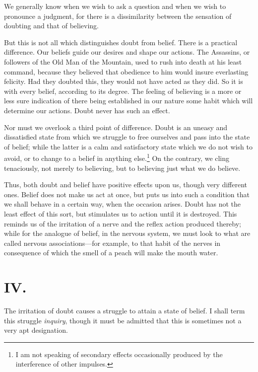We generally know when we wish to ask a question and when we wish to
pronounce a judgment, for there is a dissimilarity between the
sensation of doubting and that of believing.

But this is not all which distinguishes doubt from belief. There is a
practical difference. Our beliefs guide our desires and shape our
actions. The Assassins, or followers of the Old Man of the Mountain,
used to rush into death at his least command, because they believed
that obedience to him would insure everlasting felicity. Had they
doubted this, they would not have acted as they did. So it is with
every belief, according to its degree. The feeling of believing is a
more or less sure indication of there being established in our nature
some habit which will determine our actions. Doubt never has such an
effect.

Nor must we overlook a third point of difference. Doubt is an uneasy
and dissatisfied state from which we struggle to free ourselves and
pass into the state of belief; while the latter is a calm and
satisfactory state which we do not wish to avoid, or to change to a
belief in anything else.\footnote{I am not speaking of secondary
effects occasionally produced by the interference of other impulses.}
On the contrary, we cling tenaciously, not merely to believing, but to
believing just what we do believe.

Thus, both doubt and belief have positive effects upon us,
though very different ones. Belief does not make us act at once, but
puts us into such a condition that we shall behave in a certain way,
when the occasion arises. Doubt has not the least effect of this sort,
but stimulates us to action until it is destroyed. This reminds us of
the irritation of a nerve and the reflex action produced thereby;
while for the analogue of belief, in the nervous system, we must look
to what are called nervous as\-so\-ci\-a\-tions---for example, to
that habit of the nerves in consequence of which the smell of a peach
will make the mouth water.

\section*{IV.}

The irritation of doubt causes a struggle to attain a state of belief.
I shall term this struggle \textit{inquiry}, though it must be admitted
that this is sometimes not a very apt designation.

